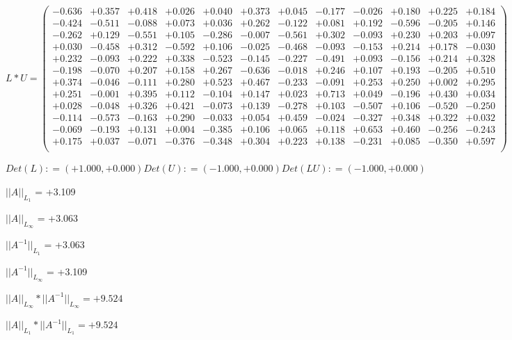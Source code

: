 \documentclass[9pt]{article}
\theoremstyle{plain}
\theoremstyle{definition}
\theoremstyle{remark}
\numberwithin{equation}{section}
\begin{document}
$L * U  = \left(
\begin{array}{
cccccccccccc}
-0.636 & +0.357 & +0.418 & +0.026 & +0.040 & +0.373 & +0.045 & -0.177 & -0.026 & +0.180 & +0.225 & +0.184 \\
-0.424 & -0.511 & -0.088 & +0.073 & +0.036 & +0.262 & -0.122 & +0.081 & +0.192 & -0.596 & -0.205 & +0.146 \\
-0.262 & +0.129 & -0.551 & +0.105 & -0.286 & -0.007 & -0.561 & +0.302 & -0.093 & +0.230 & +0.203 & +0.097 \\
+0.030 & -0.458 & +0.312 & -0.592 & +0.106 & -0.025 & -0.468 & -0.093 & -0.153 & +0.214 & +0.178 & -0.030 \\
+0.232 & -0.093 & +0.222 & +0.338 & -0.523 & -0.145 & -0.227 & -0.491 & +0.093 & -0.156 & +0.214 & +0.328 \\
-0.198 & -0.070 & +0.207 & +0.158 & +0.267 & -0.636 & -0.018 & +0.246 & +0.107 & +0.193 & -0.205 & +0.510 \\
+0.374 & -0.046 & -0.111 & +0.280 & +0.523 & +0.467 & -0.233 & -0.091 & +0.253 & +0.250 & +0.002 & +0.295 \\
+0.251 & -0.001 & +0.395 & +0.112 & -0.104 & +0.147 & +0.023 & +0.713 & +0.049 & -0.196 & +0.430 & +0.034 \\
+0.028 & -0.048 & +0.326 & +0.421 & -0.073 & +0.139 & -0.278 & +0.103 & -0.507 & +0.106 & -0.520 & -0.250 \\
-0.114 & -0.573 & -0.163 & +0.290 & -0.033 & +0.054 & +0.459 & -0.024 & -0.327 & +0.348 & +0.322 & +0.032 \\
-0.069 & -0.193 & +0.131 & +0.004 & -0.385 & +0.106 & +0.065 & +0.118 & +0.653 & +0.460 & -0.256 & -0.243 \\
+0.175 & +0.037 & -0.071 & -0.376 & -0.348 & +0.304 & +0.223 & +0.138 & -0.231 & +0.085 & -0.350 & +0.597 \\
\end{array}
\right)$ \newline 

$Det(L) :    = (+1.000,+0.000)     Det(U) :    = (-1.000,+0.000)     Det(LU) :    = (-1.000,+0.000)$

$||A||_{L_1}$  = +3.109

$||A||_{L_{\infty}}$ = +3.063

$||A^{-1}||_{L_1}$  = +3.063

$||A^{-1}||_{L_{\infty}}$ = +3.109

$||A||_{L_{\infty}} * ||A^{-1}||_{L_{\infty}} = +9.524$

$||A||_{L_1} * ||A^{-1}||_{L_1} = +9.524$
\end{document}
